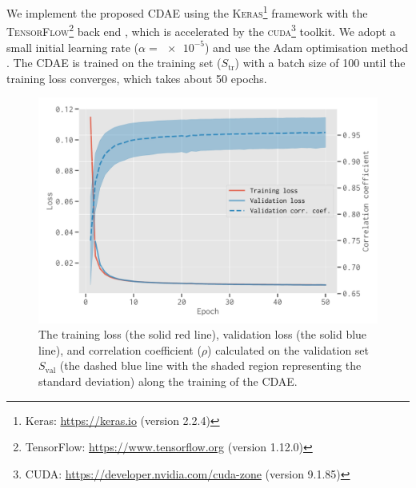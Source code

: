 \documentclass[fleqn,usenatbib]{mnras}
\newcommand{\R}[1]{\mathrm{#1}}
\newcommand{\editone}[1]{{\leavevmode\color{cyan}#1}}
\begin{document}
We implement the proposed CDAE using the
\textsc{Keras}\footnote{Keras: \url{https://keras.io}
  (\editone{version 2.2.4})}
framework \citep{keras} with the
\textsc{TensorFlow}\footnote{TensorFlow:
  \url{https://www.tensorflow.org} (\editone{version 1.12.0})}
back end \citep{tensorflow},
\editone{%
which is accelerated by the \textsc{cuda}\footnote{\raggedright%
  CUDA: \url{https://developer.nvidia.com/cuda-zone} (version 9.1.85)}
toolkit.
We adopt a small initial learning rate ($\alpha = \num{e-5}$) and use the
Adam optimisation method \citep{kingma2015}.
The CDAE is trained on the training set ($S_{\R{tr}}$) with a batch size of
100 until the training loss converges, which takes about 50 epochs.
} %

\begin{figure}
  \centering
  \includegraphics[width=\columnwidth]{cdae-train}
  \caption{\label{fig:train}%
    The training loss (the solid red line), validation loss (the solid blue
    line), and correlation coefficient ($\rho$) calculated on the
    validation set $S_{\R{val}}$ (the \editone{dashed blue} line with the
    shaded region representing the standard deviation) along the training
    of the CDAE.
  }
\end{figure}
\end{document}
